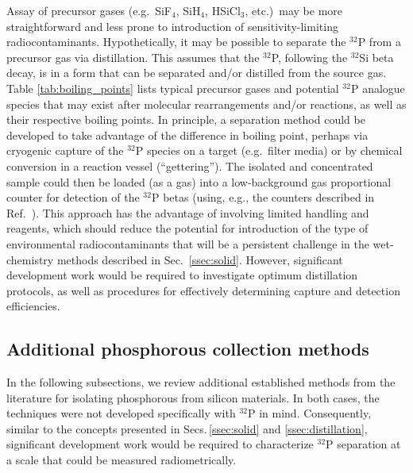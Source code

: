 \documentclass[final,5p]{elsarticle}
\def\si{$^{32}$Si\xspace}
\def\p{$^{32}$P\xspace}
\begin{document}
Assay of precursor gases (e.g.\ SiF$_4$, SiH$_4$, HSiCl$_3$, etc.)\ may be more straightforward and less prone to introduction of sensitivity-limiting radiocontaminants. Hypothetically, it may be possible to separate the \p from a precursor gas via distillation. This assumes that the \p, following the \si beta decay, is in a form that can be separated and/or distilled from the source gas. Table \ref{tab:boiling_points} lists typical precursor gases and potential \p analogue species that may exist after molecular rearrangements and/or reactions, as well as their respective boiling points. In principle, a separation method could be developed to take advantage of the difference in boiling point, perhaps via cryogenic capture of the \p species on a target (e.g.\ filter media) or by chemical conversion in a reaction vessel (``gettering''). The isolated and concentrated sample could then be loaded (as a gas) into a low-background gas proportional counter for detection of the \p betas (using, e.g., the counters described in Ref.\ \cite{ulbpc}). This approach has the advantage of involving limited handling and reagents, which should reduce the potential for introduction of the type of environmental radiocontaminants that will be a persistent challenge in the wet-chemistry methods described in Sec.~\ref{ssec:solid}. However, significant development work would be required to investigate  optimum distillation protocols, as well as procedures for effectively determining capture and detection efficiencies.

\subsection{Additional phosphorous collection methods}\label{ssec:p_removal}
In the following subsections, we review additional established methods from the literature for isolating phosphorous from silicon materials.  In both cases, the techniques were not developed specifically with \p in mind. Consequently, similar to the concepts presented in Secs.\,\ref{ssec:solid} and \ref{ssec:distillation}, significant development work would be required to characterize \p separation at a scale that could be measured radiometrically.
\end{document}
